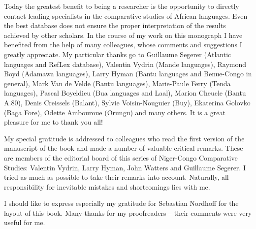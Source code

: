 
Today the greatest benefit to being a researcher is the opportunity to directly contact leading specialists in the comparative studies of African languages. Even the best database does not ensure the proper interpretation of the results achieved by other scholars. In the course of my work on this monograph I have benefited from the help of many colleagues, whose comments and suggestions I greatly appreciate.  My particular thanks go to Guillaume Segerer (Atlantic languages and RefLex database), Valentin Vydrin (Mande languages), Raymond Boyd (Adamawa languages), Larry Hyman (Bantu languages and Benue-Congo in general), Mark Van de Velde (Bantu languages), Marie-Paule Ferry (Tenda languages), Pascal Boyeldieu (Bua languages and Laal), Marion Cheucle (Bantu A.80), Denis Creissels (Balant), Sylvie Voisin-Nouguier (Buy), Ekaterina Golovko (Baga Fore), Odette Ambouroue (Orungu) and many others. It is a great pleasure for me to thank you all!

My special gratitude is addressed to colleagues who read the first version of the manuscript of the book and made a number of valuable critical remarks. These are members of the editorial board of this series of Niger-Congo Comparative Studies: Valentin Vydrin, Larry Hyman, John Watters and Guillaume Segerer. I tried as much as possible to take their remarks into account. Naturally, all responsibility for inevitable mistakes and shortcomings lies with me.

I should like to express especially my gratitude for Sebastian Nordhoff for the layout of this book. Many thanks for my proofreaders  – their comments were very useful for me.

